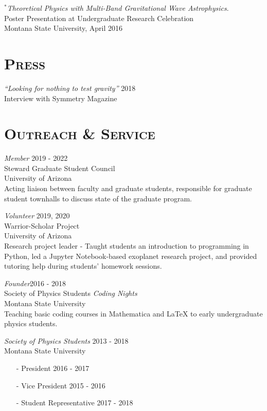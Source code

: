 \documentclass[margin]{res}
\begin{document}
\begin{resume}
\emph{$^{*}$Theoretical Physics with Multi-Band Gravitational Wave Astrophysics}. \\
Poster Presentation at Undergraduate Research Celebration\\  Montana State University, April 2016
\bigskip


\section{\textsc{Press}}
{\sl ``Looking for nothing to test gravity''} \hfill 2018\\
Interview with Symmetry Magazine

\section{\textsc{Outreach \& Service}}
{\sl Member }\hfill 2019 - 2022\\
Steward Graduate Student Council\\
University of Arizona\\
{\footnotesize Acting liaison between faculty and graduate students, responsible for graduate student townhalls to discuss state of the graduate program. }

{\sl Volunteer }\hfill 2019, 2020\\
Warrior-Scholar Project\\
University of Arizona\\
{\footnotesize Research project leader - Taught students an introduction to programming in Python, led a Jupyter Notebook-based exoplanet research project, and provided tutoring help during students' homework sessions.}

{\sl Founder}\hfill 2016 - 2018\\
Society of Physics Students \emph{Coding Nights}\\
Montana State University\\
{\footnotesize Teaching basic coding courses in Mathematica and LaTeX to early undergraduate physics students.}

{\sl Society of Physics Students}  \hfill 2013 - 2018\\
Montana State University
\begin{itemize}
\item[-] President \hfill 2016 - 2017
\item[-]Vice President \hfill 2015 - 2016
\item[-]Student Representative \hfill 2017 - 2018
\end{itemize}



\end{resume}
\end{document}
